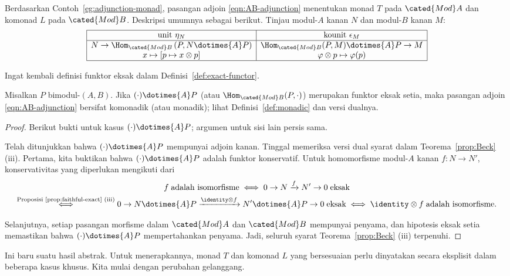 Berdasarkan Contoh~\ref{eg:adjunction-monad}, pasangan adjoin
\eqref{eqn:AB-adjunction} menentukan monad $T$ pada $\cated{Mod}A$ dan
komonad $L$ pada $\cated{Mod}B$. Deskripsi umumnya sebagai berikut. Tinjau
modul-$A$ kanan $N$ dan modul-$B$ kanan $M$:
\begin{equation}\label{eqn:bimod-adjunction}
	\begin{array}{|c|c|} \hline
		\text{unit } \eta_N & \text{kounit } \epsilon_M \\ \hline
		N \to \Hom_{\cated{Mod}B}\left( P, N \dotimes{A} P \right) & \Hom_{\cated{Mod}B}(P, M) \dotimes{A} P \to M \\
		x \mapsto \left[ p \mapsto x \otimes p \right] & \varphi \otimes p \mapsto \varphi(p) \\ \hline
	\end{array}
\end{equation}

Ingat kembali definisi funktor eksak dalam Definisi~\ref{def:exact-functor}.

\begin{proposition}\label{prop:Morita-descent}
	Misalkan $P$ bimodul-$(A,B)$. Jika
	$(\mathord\cdot)\dotimes{A}P$ (atau
	$\Hom_{\cated{Mod}B}(P,\mathord\cdot)$) merupakan funktor eksak setia,
	maka pasangan adjoin \eqref{eqn:AB-adjunction} bersifat komonadik (atau
	monadik); lihat Definisi~\ref{def:monadic} dan versi dualnya.
\end{proposition}
\begin{proof}
	Berikut bukti untuk kasus $(\mathord\cdot)\dotimes{A}P$; argumen untuk
	sisi lain persis sama.

	Telah ditunjukkan bahwa $(\mathord\cdot)\dotimes{A}P$ mempunyai adjoin
	kanan. Tinggal memeriksa versi dual syarat dalam Teorema~\ref{prop:Beck}
	(iii). Pertama, kita buktikan bahwa $(\mathord\cdot)\dotimes{A}P$ adalah
	funktor konservatif. Untuk homomorfisme modul-$A$ kanan $f:N\to N'$,
	konservativitas yang diperlukan mengikuti dari
	\begin{multline*}
		f \;\text{adalah isomorfisme} \iff 0 \to N \xrightarrow{f} N' \to 0 \;\text{eksak} \\
		\stackrel{\text{Proposisi \ref{prop:faithful-exact} (iii)}}{\iff} 0 \to N \dotimes{A} P \xrightarrow{\identity \otimes f} N' \dotimes{A} P \to 0 \;\text{eksak} \iff \identity \otimes f \;\text{adalah isomorfisme}.
	\end{multline*}

	Selanjutnya, setiap pasangan morfisme dalam $\cated{Mod}A$ dan
	$\cated{Mod}B$ mempunyai penyama, dan hipotesis eksak setia memastikan
	bahwa $(\mathord\cdot)\dotimes{A}P$ mempertahankan penyama. Jadi, seluruh
	syarat Teorema~\ref{prop:Beck} (iii) terpenuhi.
\end{proof}

Ini baru suatu hasil abstrak. Untuk menerapkannya, monad $T$ dan komonad $L$
yang bersesuaian perlu dinyatakan secara eksplisit dalam beberapa kasus
khusus. Kita mulai dengan perubahan gelanggang.

